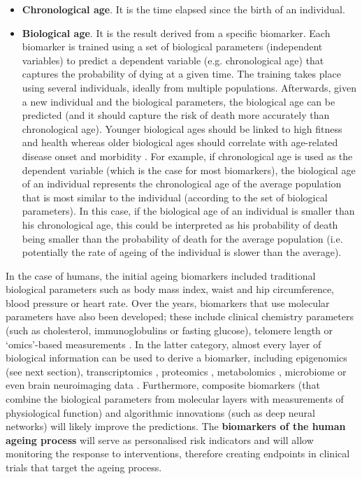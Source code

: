 \begin{itemize}
	
	\item \textbf{Chronological age}. It is the time elapsed since the birth of an individual.
	
	\item \textbf{Biological age}. It is the result derived from a specific biomarker. Each biomarker is trained using a set of biological parameters (independent variables) to predict a dependent variable (e.g. chronological age) that captures the probability of dying at a given time. The training takes place using several individuals, ideally from multiple populations. Afterwards, given a new individual and the biological parameters, the biological age can be predicted (and it should capture the risk of death more accurately than chronological age). Younger biological ages should be linked to high fitness and health whereas older biological ages should correlate with age-related disease onset and morbidity \citep{Benayoun2015a}. For example, if chronological age is used as the dependent variable (which is the case for most biomarkers), the biological age of an individual represents the chronological age of the average population that is most similar to the individual (according to the set of biological parameters). In this case, if the biological age of an individual is smaller than his chronological age, this could be interpreted as his probability of death being smaller than the probability of death for the average population (i.e. potentially the rate of ageing of the individual is slower than the average). 
	
\end{itemize}

In the case of humans, the initial ageing biomarkers included traditional biological parameters such as body mass index, waist and hip circumference, blood pressure or heart rate. Over the years, biomarkers that use molecular parameters have also been developed; these include clinical chemistry parameters (such as cholesterol, immunoglobulins or fasting glucose), telomere length or `omics'-based measurements \citep{Burkle2015a,Jylhava2017}. In the latter category, almost every layer of biological information can be used to derive a biomarker, including epigenomics (see next section), transcriptomics \citep{Peters2015a}, proteomics \citep{Tanaka2018}, metabolomics \citep{Hertel2016}, microbiome \citep{Galkin2018} or even brain neuroimaging data \citep{Cole2017a}. Furthermore, composite biomarkers (that combine the biological parameters from molecular layers with measurements of physiological function) \citep{Khan2017} and algorithmic innovations (such as deep neural networks) \citep{Putin2016} will likely improve the predictions. The \textbf{biomarkers of the human ageing process} will serve as personalised risk indicators and will allow monitoring the response to interventions, therefore creating endpoints in clinical trials that target the ageing process.

